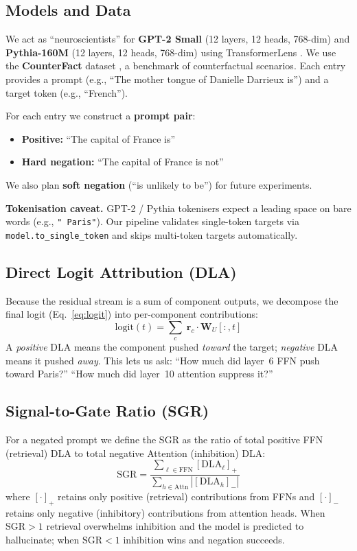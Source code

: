 \documentclass[11pt]{article}
\begin{document}
\subsection{Models and Data}
We act as ``neuroscientists'' for \textbf{GPT-2 Small}
(12 layers, 12 heads, 768-dim) and \textbf{Pythia-160M}
(12 layers, 12 heads, 768-dim) using TransformerLens \cite{nanda2022transformerlens}.
We use the \textbf{CounterFact} dataset \cite{meng-etal-2022-locating}, a benchmark of
counterfactual scenarios.  Each entry provides a prompt (e.g., ``The mother
tongue of Danielle Darrieux is'') and a target token (e.g., ``French'').

For each entry we construct a \textbf{prompt pair}:
\begin{itemize}
\item \textbf{Positive:} ``The capital of France is''
\item \textbf{Hard negation:} ``The capital of France is not''
\end{itemize}
We also plan \textbf{soft negation} (``is unlikely to be'') for future
experiments.

\textbf{Tokenisation caveat.}  GPT-2 / Pythia tokenisers expect a leading
space on bare words (e.g., \verb|" Paris"|).  Our pipeline validates
single-token targets via \verb|model.to_single_token| and skips
multi-token targets automatically.

\subsection{Direct Logit Attribution (DLA)}
\label{sec:dla}
Because the residual stream is a sum of component outputs, we decompose
the final logit (Eq.~\ref{eq:logit}) into per-component contributions:
\begin{equation}
\mathrm{logit}(t) = \sum_{c}\; \mathbf{r}_c \cdot \mathbf{W}_U[:,t]
\end{equation}
A \emph{positive} DLA means the component pushed \emph{toward} the target;
\emph{negative} DLA means it pushed \emph{away}.  This lets us ask:
``How much did layer~6 FFN push toward Paris?''  ``How much did layer~10
attention suppress it?''

\subsection{Signal-to-Gate Ratio (SGR)}
\label{sec:sgr}
For a negated prompt we define the SGR as the ratio of total positive
FFN (retrieval) DLA to total negative Attention (inhibition) DLA:
\begin{equation}
\mathrm{SGR}
= \frac{\sum_{\ell \in \mathrm{FFN}} [\mathrm{DLA}_\ell]_+}
       {\sum_{h \in \mathrm{Attn}} |[\mathrm{DLA}_h]_-|}
\label{eq:sgr}
\end{equation}
where $[\cdot]_+$ retains only positive (retrieval) contributions from FFNs
and $[\cdot]_-$ retains only negative (inhibitory) contributions from
attention heads.  When $\mathrm{SGR} > 1$ retrieval overwhelms inhibition
and the model is predicted to hallucinate; when $\mathrm{SGR} < 1$
inhibition wins and negation succeeds.
\end{document}
